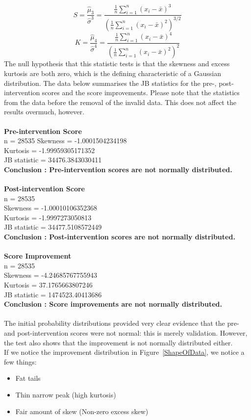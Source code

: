\documentclass[10pt]{article}
\begin{document}
\[S = \frac{ \hat{\mu}_3 }{ \hat{\sigma}^3 } 
        = \frac{\frac1n \sum_{i=1}^n (x_i-\bar{x})^3} {\left(\frac1n \sum_{i=1}^n (x_i-\bar{x})^2 \right)^{3/2}}\]
\[
K = \frac{ \hat{\mu}_4 }{ \hat{\sigma}^4 }  
        = \frac{\frac1n \sum_{i=1}^n (x_i-\bar{x})^4} {\left(\frac1n \sum_{i=1}^n (x_i-\bar{x})^2 \right)^2}
\]
The null hypothesis that this statistic tests is that the skewness and excess kurtosis are both zero, which is the defining characteristic of a Gaussian distribution. The data below summarises the JB statistics for the pre-, post-intervention scores and the score improvements. Please note that the statistics from the data before the removal of the invalid data. This does not affect the results overmuch, however.\\\\
\textbf{Pre-intervention Score}\\
n = 28535
Skewness = -1.0001504234198\\
Kurtosis = -1.99959305171352\\
JB statistic = 34476.3843030411\\
\textbf{Conclusion : Pre-intervention scores are not normally distributed.}\\\\
\textbf{Post-intervention Score}\\
n = 28535\\
Skewness = -1.00010106352368\\
Kurtosis = -1.9997273050813\\
JB statistic = 34477.5108572449\\
\textbf{Conclusion : Post-intervention scores are not normally distributed.}\\\\
\textbf{Score Improvement}\\
n = 28535\\
Skewness = -4.24685767755943\\
Kurtosis = 37.1765663807246\\
JB statistic = 1474523.40413686\\
\textbf{Conclusion : Score improvements are not normally distributed.}\\\\
The initial probability distributions provided very clear evidence that the pre- and post-intervention scores were not normal: this is merely validation. However, the test also shows that the improvement is not normally distributed either.\\
If we notice the improvement distribution in Figure~\ref{ShapeOfData}, we notice a few things:
\begin{itemize}
\item Fat tails
\item Thin narrow peak (high kurtosis)
\item Fair amount of skew (Non-zero excess skew)
\end{itemize}
\end{document}

